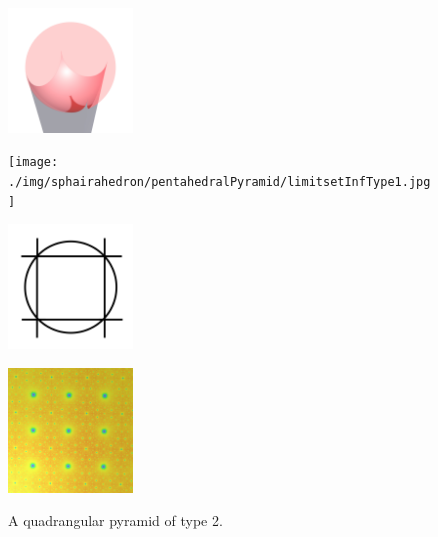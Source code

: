 \documentclass[suppldata, dvipdfmx]{interact}
\theoremstyle{plain}%
\theoremstyle{definition}
\theoremstyle{remark}
\theoremstyle{problemstyle}
\begin{document}
\begin{figure}[h!tbp]
  \begin{minipage}[t]{0.23\textwidth}
   \centering \includegraphics[width=1.3in,
   keepaspectratio]{./img/sphairahedron/pentahedralPyramid/sphairahedronInfType1.jpg}
   \subcaption{}
   \label{fig:pentahedralPyramidInf_b}
  \end{minipage}
  \hspace*{\fill}
  \begin{minipage}[t]{0.23\textwidth}
   \centering
   \texttt{[image: ./img/sphairahedron/pentahedralPyramid/limitsetInfType1.jpg]}
   \subcaption{}
   \label{fig:pentahedralPyramidLimitset_b}
  \end{minipage}
 \hspace*{\fill}
  \begin{minipage}[t]{0.23\textwidth}
   \centering
   \includegraphics[width=1.3in, keepaspectratio]{./img/HexahedraWithSphericalFaces/pentahedralPyramid/slice_b.jpg}
   \subcaption{}
   \label{fig:pentahedralPyramidSlice_b}
  \end{minipage}
 \hspace*{\fill}
  \begin{minipage}[t]{0.23\textwidth}
   \centering
   \includegraphics[width=1.3in, keepaspectratio]{./img/sphairahedron/pentahedralPyramid/limitsetAbove_b.jpg}
   \subcaption{}
   \label{fig:pentahedralPyramidAbove_b}
  \end{minipage}
 \hspace*{\fill}
 \caption{A quadrangular pyramid of type 2.}
 \label{fig:quadrangularPyramid_Inf_2}
\end{figure}
\end{document}
